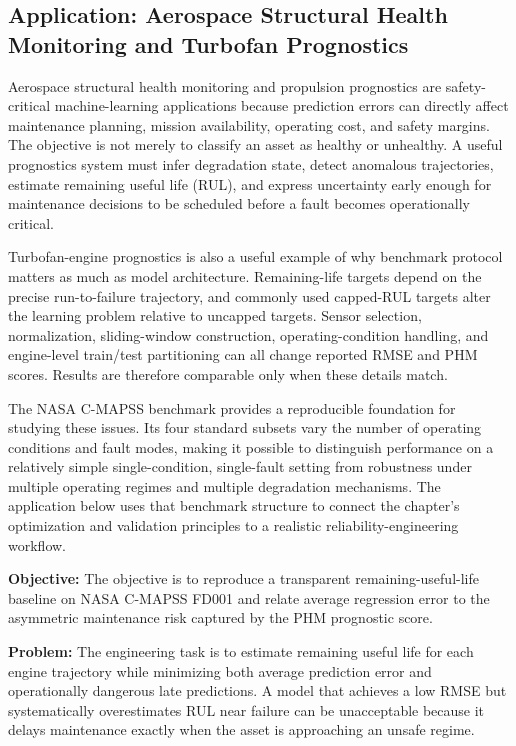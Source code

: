 \subsection{Application: Aerospace Structural Health Monitoring and Turbofan Prognostics}

Aerospace structural health monitoring and propulsion prognostics are safety-critical machine-learning applications because prediction errors can directly affect maintenance planning, mission availability, operating cost, and safety margins. The objective is not merely to classify an asset as healthy or unhealthy. A useful prognostics system must infer degradation state, detect anomalous trajectories, estimate remaining useful life (RUL), and express uncertainty early enough for maintenance decisions to be scheduled before a fault becomes operationally critical.

Turbofan-engine prognostics is also a useful example of why benchmark protocol matters as much as model architecture. Remaining-life targets depend on the precise run-to-failure trajectory, and commonly used capped-RUL targets alter the learning problem relative to uncapped targets. Sensor selection, normalization, sliding-window construction, operating-condition handling, and engine-level train/test partitioning can all change reported RMSE and PHM scores. Results are therefore comparable only when these details match.

The NASA C-MAPSS benchmark provides a reproducible foundation for studying these issues. Its four standard subsets vary the number of operating conditions and fault modes, making it possible to distinguish performance on a relatively simple single-condition, single-fault setting from robustness under multiple operating regimes and multiple degradation mechanisms. The application below uses that benchmark structure to connect the chapter's optimization and validation principles to a realistic reliability-engineering workflow.

\textbf{Objective:} The objective is to reproduce a transparent remaining-useful-life baseline on NASA C-MAPSS FD001 and relate average regression error to the asymmetric maintenance risk captured by the PHM prognostic score.

\textbf{Problem:} The engineering task is to estimate remaining useful life for each engine trajectory while minimizing both average prediction error and operationally dangerous late predictions. A model that achieves a low RMSE but systematically overestimates RUL near failure can be unacceptable because it delays maintenance exactly when the asset is approaching an unsafe regime.

